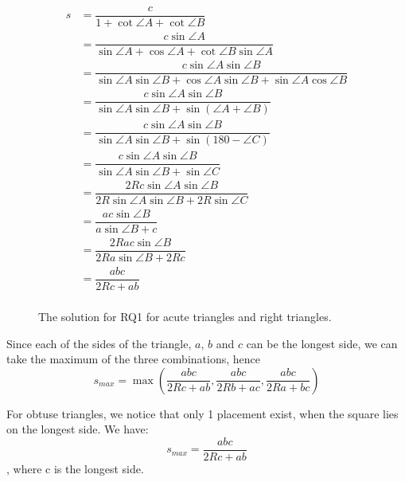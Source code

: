 \documentclass[12pt]{scrartcl}
\begin{document}
\begin{figure}[htpb]
	\centering
	\begin{align*}
		s              & = \dfrac{c}{1+\cot \angle A+\cot \angle B}                                                                             \\
		               & = \dfrac{c \sin\angle A}{\sin\angle A+\cos\angle A+\cot\angle B\sin\angle A}                                        \\
		               & = \dfrac{c\sin\angle A\sin\angle B}{\sin\angle A\sin\angle B+\cos\angle A\sin\angle B+\sin\angle A\cos\angle B} \\
		               & = \dfrac{c\sin\angle A\sin\angle B}{\sin\angle A\sin\angle B+\sin\left(\angle A+\angle B\right)}                    \\
		               & = \dfrac{c\sin\angle A\sin\angle B}{\sin\angle A\sin\angle B+\sin\left(180-\angle C\right)}                         \\
		               & = \dfrac{c\sin\angle A\sin\angle B}{\sin\angle A\sin\angle B+\sin \angle C}                                         \\
		               & = \dfrac{2Rc\sin\angle A\sin\angle B}{2R\sin\angle A\sin \angle B+2R\sin \angle C}                                   \\
		               & = \dfrac{ac\sin\angle B}{a\sin\angle B+c}                                                                             \\
		               & = \dfrac{2Rac\sin\angle B}{2Ra\sin\angle B+2Rc}                                                                       \\
		               & = \dfrac{abc}{2Rc+ab}                                                                                                   \\
	\end{align*}
	\caption{The solution for RQ1 for acute triangles and right triangles.}
	\label{fig:rq1m}
\end{figure}

Since each of the sides of the triangle, $a$, $b$ and $c$ can be the longest side, 
we can take the maximum of the three combinations, hence
\begin{equation}
s_{max} = \max\left(\dfrac{abc}{2Rc+ab},\dfrac{abc}{2Rb+ac},\dfrac{abc}{2Ra+bc}\right)
\end{equation}

For obtuse triangles, we notice that only 1 placement exist, when the square lies on the longest side. We have: 
\begin{equation}
s_{max} = \dfrac{abc}{2Rc+ab}
\end{equation}
, where c is the longest side.

\printbibliography
\end{document}

